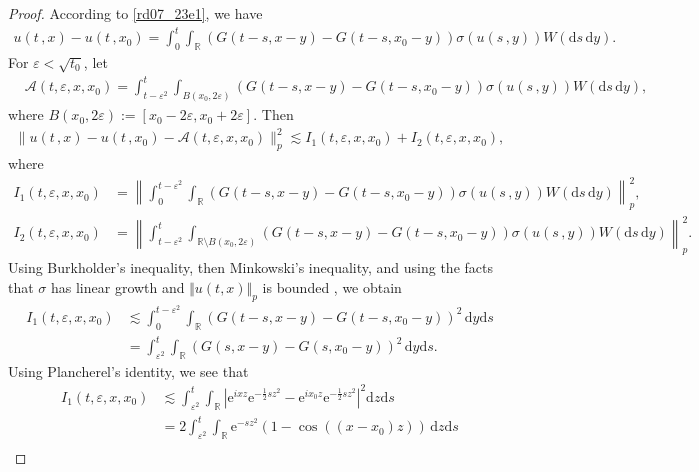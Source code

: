 \documentclass[12pt,a4paper]{article}
\newcommand{\R}{{\mathbb{R}}}
\renewcommand{\d}{\mathrm{d}}
\newcommand{\<}{\langle}
\renewcommand{\>}{\rangle}
\newcommand{\e}{\mathrm{e}}
\begin{document}
\begin{proof}
According to \eqref{rd07_23e1}, we have
\begin{align*}
           u(t\,,x)- u(t\,,x_0)
           = \int_0^t\int_\R (G(t-s, x-y)- G(t-s, x_0-y))\sigma(u(s\,,y)) W(\d s\, \d y).
 \end{align*}
For $\varepsilon <\sqrt{t_0}$, let
\begin{align*}
           &\mathcal{A}(t, \varepsilon, x, x_0) 
           = \int_{t-\varepsilon^2}^t\int_{B(x_0, 2\varepsilon)} (G(t-s, x-y)- G(t-s, x_0-y))\sigma(u(s\,,y)) W(\d s\, \d y),
\end{align*}
where $B(x_0, 2\varepsilon):= [x_0-2\varepsilon, x_0+2\varepsilon]$. Then 
 \begin{align} \label{I1+I2}
          \|u(t\,,x)- u(t\,,x_0) - \mathcal{A}(t, \varepsilon, x, x_0)\|^2_p\lesssim I_1(t, \varepsilon, x, x_0)+I_2(t, \varepsilon, x, x_0),
\end{align}
where         
 \begin{align*}
       I_1(t, \varepsilon, x, x_0)     &=  \left\|\int_0^{t-\varepsilon^2}\int_\R (G(t-s, x-y)- G(t-s, x_0-y))\sigma(u(s\,,y)) W(\d s\, \d y)\right\|^2_p, \\
       I_2(t, \varepsilon, x, x_0)     &=\left\| \int_{t-\varepsilon^2}^t\int_{\R\setminus B(x_0, 2\varepsilon)} (G(t-s, x-y)- G(t-s, x_0-y))\sigma(u(s\,,y)) W(\d s\, \d y)\right\|^2_p.
\end{align*}
Using Burkholder's inequality, then Minkowski's inequality, and using the facts that $\sigma$ has linear growth and $\Vert u(t, x) \Vert_p$ is bounded \cite[Theorem 4.2.1]{dss}, we obtain
\begin{align*}
           I_1(t, \varepsilon, x, x_0) &\lesssim   \int_0^{t-\varepsilon^2}\int_\R (G(t-s, x-y)- G(t-s, x_0-y))^2\, \d y \d s\\
           &=  \int_{\varepsilon^2}^{t}\int_\R (G(s, x-y)- G(s, x_0-y))^2\,  \d y \d s.
\end{align*}
Using  Plancherel's identity, we see that
\begin{align*}
           I_1(t, \varepsilon, x, x_0) &\lesssim \int_{\varepsilon^2}^t\int_\R \left| \e^{ixz}\e^{-\frac12sz^2} - 
            \e^{ix_0z}\e^{-\frac12sz^2}\right|^2\d z \d s\\
            &= 2 \int_{\varepsilon^2}^t\int_\R \e^{-sz^2} (1- \cos((x-x_0)z))\, \d z \d s\\

\end{align*}
\end{proof}
\end{document}
